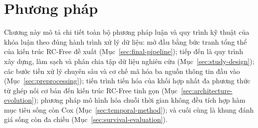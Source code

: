 \chapter{Phương pháp}
\label{chap:method}

Chương này mô tả chi tiết toàn bộ phương pháp luận và quy trình kỹ thuật của khóa luận theo đúng hành trình xử lý dữ liệu: mở đầu bằng bức tranh tổng thể của kiến trúc RC-Free đề xuất (Mục~\ref{sec:final-pipeline}); tiếp đến là quy trình xây dựng, làm sạch và phân chia tập dữ liệu nghiên cứu (Mục~\ref{sec:study-design}); các bước tiền xử lý chuyên sâu và cơ chế mã hóa ba nguồn thông tin đầu vào (Mục~\ref{sec:preprocessing}); tiến trình tiến hóa của khối hợp nhất đa phương thức từ ghép nối cơ bản đến kiến trúc RC-Free tinh gọn (Mục~\ref{sec:architecture-evolution}); phương pháp mô hình hóa chuỗi thời gian không đều tích hợp hàm mục tiêu sống còn Cox (Mục~\ref{sec:temporal-method}); và cuối cùng là khung đánh giá sống còn đa chiều (Mục~\ref{sec:survival-evaluation}).

